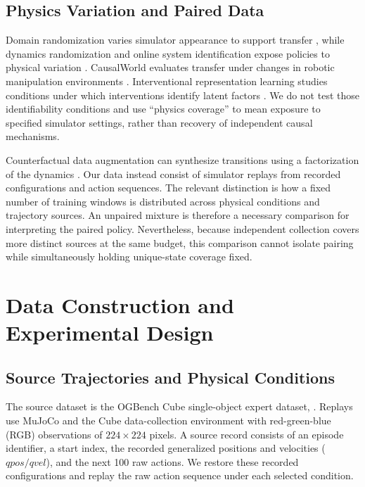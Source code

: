\subsection{Physics Variation and Paired Data}
Domain randomization varies simulator appearance to support transfer \cite{tobin2017domainrandomization}, while dynamics randomization and online system identification expose policies to physical variation \cite{yu2017preparing}. CausalWorld evaluates transfer under changes in robotic manipulation environments \cite{ahmed2020causalworld}. Interventional representation learning studies conditions under which interventions identify latent factors \cite{ahuja2023interventional}. We do not test those identifiability conditions and use ``physics coverage'' to mean exposure to specified simulator settings, rather than recovery of independent causal mechanisms.

Counterfactual data augmentation can synthesize transitions using a factorization of the dynamics \cite{pitis2020counterfactual,pitis2022mocoda}. Our data instead consist of simulator replays from recorded configurations and action sequences. The relevant distinction is how a fixed number of training windows is distributed across physical conditions and trajectory sources. An unpaired mixture is therefore a necessary comparison for interpreting the paired policy. Nevertheless, because independent collection covers more distinct sources at the same budget, this comparison cannot isolate pairing while simultaneously holding unique-state coverage fixed.

\section{Data Construction and Experimental Design}
\subsection{Source Trajectories and Physical Conditions}
The source dataset is the OGBench Cube single-object expert dataset,  \cite{park2025ogbench}. Replays use MuJoCo \cite{todorov2012mujoco} and the Cube data-collection environment with red-green-blue (RGB) observations of $224\times224$ pixels. A source record consists of an episode identifier, a start index, the recorded generalized positions and velocities ($qpos/qvel$), and the next 100 raw actions. We restore these recorded configurations and replay the raw action sequence under each selected condition.

